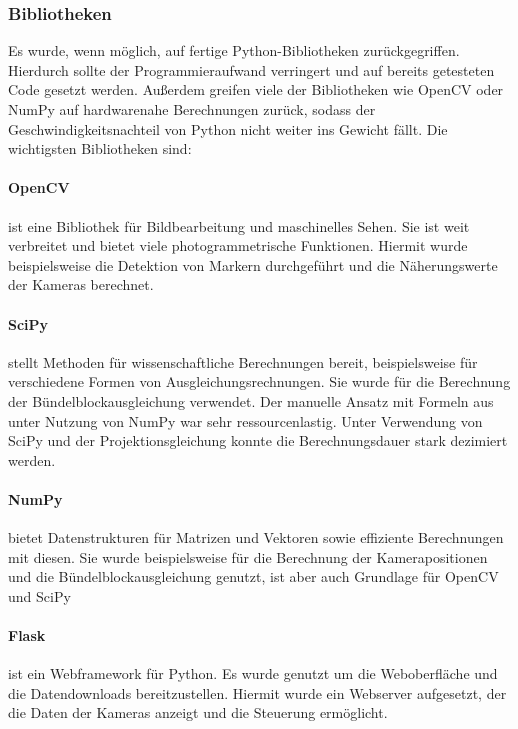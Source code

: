 \documentclass[./00PhotoBox.tex]{subfiles}
\begin{document}
\subsubsection{Bibliotheken}
Es wurde, wenn möglich, auf fertige Python-Bibliotheken zurückgegriffen. Hierdurch sollte der Programmieraufwand verringert und auf bereits getesteten Code gesetzt werden. Außerdem greifen viele der Bibliotheken wie OpenCV oder NumPy auf hardwarenahe Berechnungen zurück, sodass der Geschwindigkeitsnachteil von Python nicht weiter ins Gewicht fällt. Die wichtigsten Bibliotheken sind:

\paragraph{OpenCV}
ist eine Bibliothek für Bildbearbeitung und maschinelles Sehen. Sie ist weit verbreitet und bietet viele photogrammetrische Funktionen. Hiermit wurde beispielsweise die Detektion von Markern durchgeführt und die Näherungswerte der Kameras berechnet.

\paragraph{SciPy}
stellt Methoden für wissenschaftliche Berechnungen bereit, beispielsweise für verschiedene Formen von Ausgleichungsrechnungen. Sie wurde für die Berechnung der Bündelblockausgleichung verwendet. Der manuelle Ansatz mit Formeln aus \cite{luhmann} unter Nutzung von NumPy war sehr ressourcenlastig. Unter Verwendung von SciPy und der Projektionsgleichung konnte die Berechnungsdauer stark dezimiert werden.

\paragraph{NumPy}
bietet Datenstrukturen für Matrizen und Vektoren sowie effiziente Berechnungen mit diesen. Sie wurde beispielsweise für die Berechnung der Kamerapositionen und die Bündelblockausgleichung genutzt, ist aber auch Grundlage für OpenCV und SciPy


\paragraph{Flask}
ist ein Webframework für Python. Es wurde genutzt um die Weboberfläche und die Datendownloads bereitzustellen. Hiermit wurde ein Webserver aufgesetzt, der die Daten der Kameras anzeigt und die Steuerung ermöglicht.
\end{document}
